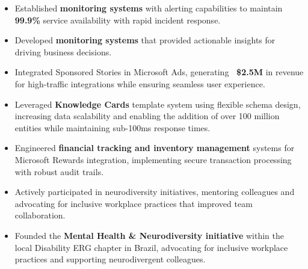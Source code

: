 \begin{itemize}
    \item \scriptsize{Established \textbf{monitoring systems} with alerting capabilities to maintain \textbf{99.9\%} service availability with rapid incident response.}

    \item \scriptsize{Developed \textbf{monitoring systems} that provided actionable insights for driving business decisions.}

    \item \scriptsize{Integrated Sponsored Stories in Microsoft Ads, generating \textbf{~\$2.5M} in revenue for high-traffic integrations while ensuring seamless user experience.}

    \item \scriptsize{Leveraged \textbf{Knowledge Cards} template system using flexible schema design, increasing data scalability and enabling the addition of over 100 million entities while maintaining sub-100ms response times.}

    \item \scriptsize{Engineered \textbf{financial tracking and inventory management} systems for Microsoft Rewards integration, implementing secure transaction processing with robust audit trails.}

    \item \scriptsize{Actively participated in neurodiversity initiatives, mentoring colleagues and advocating for inclusive workplace practices that improved team collaboration.}
    
    \item \scriptsize{Founded the \textbf{Mental Health \& Neurodiversity initiative} within the local Disability ERG chapter in Brazil, advocating for inclusive workplace practices and supporting neurodivergent colleagues.}
\end{itemize}